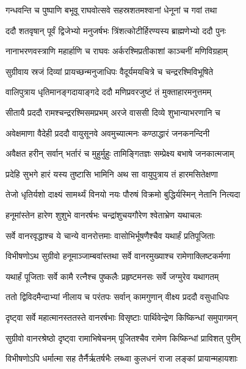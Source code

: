 \twolineshloka
{गन्धवन्ति च पुष्पाणि बभूवू राघवोत्सवे}
{सहस्रशतमश्वानां धेनूनां च गवां तथा} %

\twolineshloka
{ददौ शतवृषान् पूर्वं द्विजेभ्यो मनुजर्षभः}
{त्रिंशत्कोटीर्हिरण्यस्य ब्राह्मणेभ्यो ददौ पुनः} %

\twolineshloka
{नानाभरणवस्त्राणि महार्हाणि च राघवः}
{अर्करश्मिप्रतीकाशां काञ्चनीं मणिविग्रहाम्} %

\twolineshloka
{सुग्रीवाय स्रजं दिव्यां प्रायच्छन्मनुजाधिपः}
{वैदूर्यमयचित्रे च चन्द्ररश्मिविभूषिते} %

\twolineshloka
{वालिपुत्राय धृतिमानङ्गदायाङ्गदे ददौ}
{मणिप्रवरजुष्टं तं मुक्ताहारमनुत्तमम्} %

\twolineshloka
{सीतायै प्रददौ रामश्चन्द्ररश्मिसमप्रभम्}
{अरजे वाससी दिव्ये शुभान्याभरणानि च} %

\twolineshloka
{अवेक्षमाणा वैदेही प्रददौ वायुसूनवे}
{अवमुच्यात्मनः कण्ठाद्धारं जनकनन्दिनी} %

\twolineshloka
{अवैक्षत हरीन् सर्वान् भर्तारं च मुहुर्मुहुः}
{तामिङ्गितज्ञः सम्प्रेक्ष्य बभाषे जनकात्मजाम्} %

\twolineshloka
{प्रदेहि सुभगे हारं यस्य तुष्टासि भामिनि}
{अथ सा वायुपुत्राय तं हारमसितेक्षणा} %

\twolineshloka
{तेजो धृतिर्यशो दाक्ष्यं सामर्थ्यं विनयो नयः}
{पौरुषं विक्रमो बुद्धिर्यस्मिन् नेतानि नित्यदा} %

\twolineshloka
{हनूमांस्तेन हारेण शुशुभे वानरर्षभः}
{चन्द्रांशुचयगौरेण श्वेताभ्रेण यथाचलः} %

\twolineshloka
{सर्वे वानरवृद्धाश्च ये चान्ये वानरोत्तमाः}
{वासोभिर्भूषणैश्चैव यथार्हं प्रतिपूजिताः} %

\twolineshloka
{विभीषणोऽथ सुग्रीवो हनूमाञ्जाम्बवांस्तथा}
{सर्वे वानरमुख्याश्च रामेणाक्लिष्टकर्मणा} %

\twolineshloka
{यथार्हं पूजिताः सर्वे कामै रत्नैश्च पुष्कलैः}
{प्रहृष्टमनसः सर्वे जग्मुरेव यथागतम्} %

\twolineshloka
{ततो द्विविदमैन्दाभ्यां नीलाय च परंतपः}
{सर्वान् कामगुणान् वीक्ष्य प्रददौ वसुधाधिपः} %

\twolineshloka
{दृष्ट्वा सर्वे महात्मानस्ततस्ते वानरर्षभाः}
{विसृष्टाः पार्थिवेन्द्रेण किष्किन्धां समुपागमन्} %

\twolineshloka
{सुग्रीवो वानरश्रेष्ठो दृष्ट्वा रामाभिषेचनम्}
{पूजितश्चैव रामेण किष्किन्धां प्राविशत् पुरीम्} %

\twolineshloka
{विभीषणोऽपि धर्मात्मा सह तैर्नैर्ऋतर्षभैः}
{लब्ध्वा कुलधनं राजा लङ्कां प्रायान्महायशाः} %

